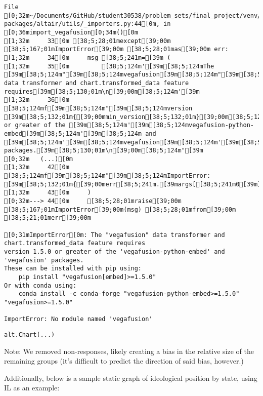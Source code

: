 \documentclass[
  letterpaper,
  DIV=11,
  numbers=noendperiod]{scrartcl}
\begin{document}
\begin{verbatim}
File [0;32m~/Documents/GitHub/student30538/problem_sets/final_project/venv/lib/python3.13/site-packages/altair/utils/_importers.py:44[0m, in [0;36mimport_vegafusion[0;34m()[0m
[1;32m     33[0m [38;5;28;01mexcept[39;00m [38;5;167;01mImportError[39;00m [38;5;28;01mas[39;00m err:
[1;32m     34[0m     msg [38;5;241m=[39m (
[1;32m     35[0m         [38;5;124m'[39m[38;5;124mThe [39m[38;5;124m"[39m[38;5;124mvegafusion[39m[38;5;124m"[39m[38;5;124m data transformer and chart.transformed_data feature requires[39m[38;5;130;01m\n[39;00m[38;5;124m'[39m
[1;32m     36[0m         [38;5;124mf[39m[38;5;124m"[39m[38;5;124mversion [39m[38;5;132;01m{[39;00mmin_version[38;5;132;01m}[39;00m[38;5;124m or greater of the [39m[38;5;124m'[39m[38;5;124mvegafusion-python-embed[39m[38;5;124m'[39m[38;5;124m and [39m[38;5;124m'[39m[38;5;124mvegafusion[39m[38;5;124m'[39m[38;5;124m packages.[39m[38;5;130;01m\n[39;00m[38;5;124m"[39m
[0;32m   (...)[0m
[1;32m     42[0m         [38;5;124mf[39m[38;5;124m"[39m[38;5;124mImportError: [39m[38;5;132;01m{[39;00merr[38;5;241m.[39margs[[38;5;241m0[39m][38;5;132;01m}[39;00m[38;5;124m"[39m
[1;32m     43[0m     )
[0;32m---> 44[0m     [38;5;28;01mraise[39;00m [38;5;167;01mImportError[39;00m(msg) [38;5;28;01mfrom[39;00m [38;5;21;01merr[39;00m

[0;31mImportError[0m: The "vegafusion" data transformer and chart.transformed_data feature requires
version 1.5.0 or greater of the 'vegafusion-python-embed' and 'vegafusion' packages.
These can be installed with pip using:
    pip install "vegafusion[embed]>=1.5.0"
Or with conda using:
    conda install -c conda-forge "vegafusion-python-embed>=1.5.0" "vegafusion>=1.5.0"

ImportError: No module named 'vegafusion'
\end{verbatim}

\begin{verbatim}
alt.Chart(...)
\end{verbatim}

Note: We removed non-responses, likely creating a bias in the relative
size of the remaining groups (it's difficult to predict the direction of
said bias, however.)

Additionally, below is a sample static graph of ideological position by
state, using IL as an example:
\end{document}
